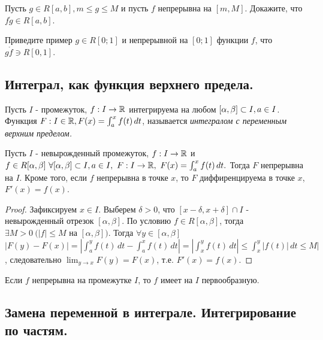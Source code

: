 \begin{problem}
    Пусть $g \in R[a, b], m \leq g \leq M$ и пусть $f$ непрерывна на $[m, M]$.
    Докажите, что $f \mathring g \in R[a, b]$.
\end{problem}

\begin{problem}
    Приведите пример $g \in R[0; 1]$ и непрерывной на $[0; 1]$ функции $f$,
    что $g \mathring f \ni R[0, 1]$.
\end{problem}

\subsection{Интеграл, как функция верхнего предела.}

\begin{definition}
    Пусть $I$ - промежуток, $f: I \to \mathbb{R}$ интегрируема на любом $[\alpha, \beta] \subset I, a \in I$.
    Функция $F: I \in \mathbb{R}, F(x) = \int_a^x f(t) \,dt$, называется \textit{интегралом с переменным верхним пределом.}
\end{definition}

\begin{theorem}
    Пусть $I$ - невырожденный промежуток, $f: I \to \mathbb{R}$
    и $f \in R[\alpha, \beta] \ \forall [\alpha, \beta] \subset I, a \in I, \ F : I \to \mathbb{R},
    \ F(x) = \int_a^x f(t) \,dt.$ Тогда $F$ непрерывна на $I$.
    Кроме того, если $f$ непрерывна в точке $x$, то $F$ диффиренцируема в точке $x$, $F'(x) = f(x)$.
\end{theorem}

\begin{proof}
    Зафиксируем $x \in I$.
    Выберем $\delta > 0$, что $[x-\delta, x+\delta] \cap I$ - невырожденный отрезок $[\alpha, \beta]$.
    По условию $f \in R[\alpha, \beta]$,
    тогда $\exists M > 0 \ (|f| \leq M$ на $[\alpha, \beta])$.
    Тогда $\forall y \in [\alpha, \beta]$
    \(|F(y) - F(x)| = |\int_a^y f(t) \,dt - \int_a^x f(t) \,dt| = 
    |\int_x^y f(t) \,dt| \leq \int_x^y |f(t)| \,dt \leq M|\),
    следовательно \(\lim_{y \to x} F(y) = F(x)\), т.е. $F'(x) = f(x)$.
\end{proof}

\begin{corollary}
    Если $f$ непрерывна на промежутке $I$, то $f$ имеет на $I$ первообразную.
\end{corollary}

\subsection{Замена переменной в интеграле. Интегрирование по частям.}

